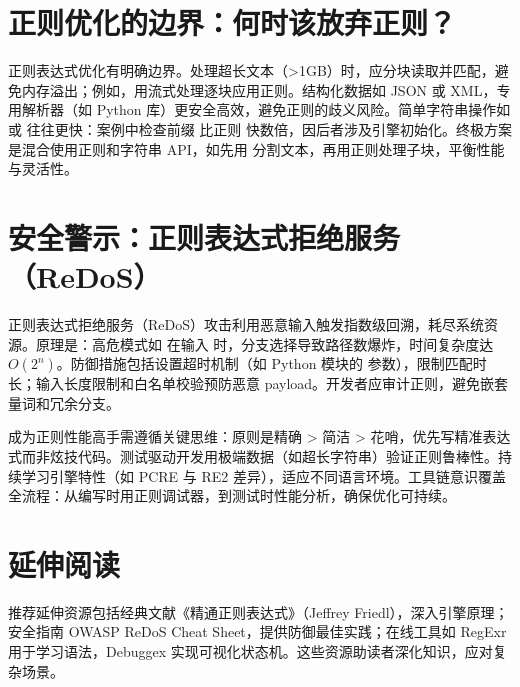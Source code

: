 \chapter{正则优化的边界：何时该放弃正则？}
正则表达式优化有明确边界。处理超长文本（>1GB）时，应分块读取并匹配，避免内存溢出；例如，用流式处理逐块应用正则。结构化数据如 JSON 或 XML，专用解析器（如 Python  库）更安全高效，避免正则的歧义风险。简单字符串操作如  或  往往更快：案例中检查前缀  比正则  快数倍，因后者涉及引擎初始化。终极方案是混合使用正则和字符串 API，如先用  分割文本，再用正则处理子块，平衡性能与灵活性。\par
\chapter{安全警示：正则表达式拒绝服务（ReDoS）}
正则表达式拒绝服务（ReDoS）攻击利用恶意输入触发指数级回溯，耗尽系统资源。原理是：高危模式如  在输入  时，分支选择导致路径数爆炸，时间复杂度达 $O(2^n)$。防御措施包括设置超时机制（如 Python  模块的  参数），限制匹配时长；输入长度限制和白名单校验预防恶意 payload。开发者应审计正则，避免嵌套量词和冗余分支。\par
成为正则性能高手需遵循关键思维：原则是精确 > 简洁 > 花哨，优先写精准表达式而非炫技代码。测试驱动开发用极端数据（如超长字符串）验证正则鲁棒性。持续学习引擎特性（如 PCRE 与 RE2 差异），适应不同语言环境。工具链意识覆盖全流程：从编写时用正则调试器，到测试时性能分析，确保优化可持续。\par
\chapter{延伸阅读}
推荐延伸资源包括经典文献《精通正则表达式》（Jeffrey Friedl），深入引擎原理；安全指南 OWASP ReDoS Cheat Sheet，提供防御最佳实践；在线工具如 RegExr 用于学习语法，Debuggex 实现可视化状态机。这些资源助读者深化知识，应对复杂场景。\par
